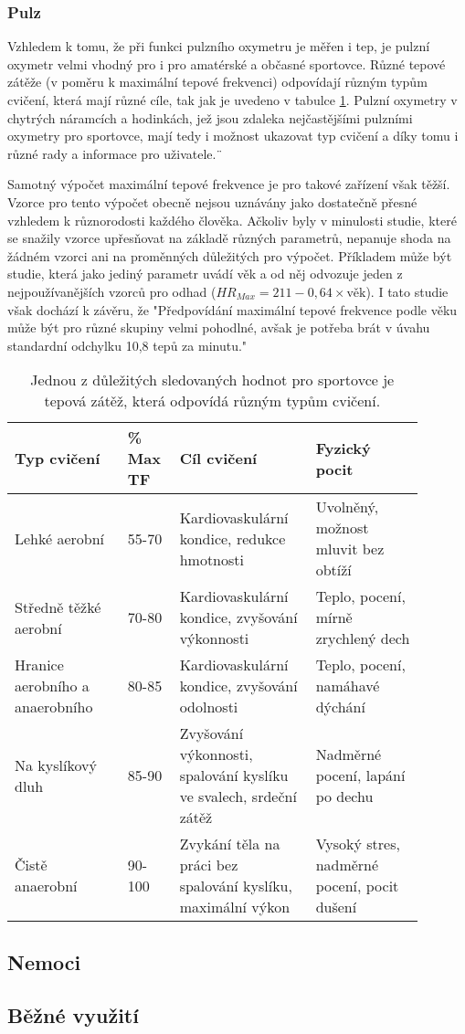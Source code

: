 \subsubsection {Pulz}
Vzhledem k tomu, že při funkci pulzního oxymetru je měřen i tep, je pulzní oxymetr velmi vhodný pro i pro amatérské a občasné sportovce. Různé tepové zátěže (v poměru k maximální tepové frekvenci) odpovídají různým typům cvičení, která mají různé cíle, tak jak je uvedeno v tabulce \ref{tab:MTF}. Pulzní oxymetry v chytrých náramcích a hodinkách, jež jsou zdaleka nejčastějšími pulzními oxymetry pro sportovce, mají tedy i možnost ukazovat typ cvičení a díky tomu i různé rady a informace pro uživatele.¨
\par Samotný výpočet maximální tepové frekvence je pro takové zařízení však těžší. Vzorce pro tento výpočet obecně nejsou uznávány jako dostatečně přesné vzhledem k různorodosti každého člověka. Ačkoliv byly v minulosti studie, které se snažily vzorce upřesňovat na základě různých parametrů, nepanuje shoda na žádném vzorci ani na proměnných důležitých pro výpočet. Příkladem může být studie, která jako jediný parametr uvádí věk a od něj odvozuje jeden z nejpoužívanějších vzorců pro odhad ($HR_{Max}=211-0,64\times\text{věk}$). I tato studie však dochází k závěru, že "Předpovídání maximální tepové frekvence podle věku může být pro různé skupiny velmi pohodlné, avšak je potřeba brát v úvahu standardní odchylku 10,8 tepů za minutu." \citep{maxHR}
\begin{table}[H]
    \centering
    \begin{tabular}{p{0.25\linewidth} | p{0.1\linewidth} | p{0.30\linewidth} | p{0.24\linewidth}}
        \textbf{Typ cvičení}            & \textbf{\% Max TF} & \textbf{Cíl cvičení}                                              & \textbf{Fyzický pocit}              \\ \hline
        Lehké aerobní                   & 55-70                    & Kardiovaskulární kondice, redukce hmotnosti                       & Uvolněný, možnost mluvit bez obtíží \\
        Středně těžké aerobní           & 70-80                    & Kardiovaskulární kondice, zvyšování výkonnosti                    & Teplo, pocení, mírně zrychlený dech \\
        Hranice aerobního a anaerobního & 80-85                    & Kardiovaskulární kondice, zvyšování odolnosti                     & Teplo, pocení, namáhavé dýchání     \\
        Na kyslíkový dluh               & 85-90                    & Zvyšování výkonnosti, spalování kyslíku ve svalech, srdeční zátěž & Nadměrné pocení, lapání po dechu    \\
        Čistě anaerobní                 & 90-100                   & Zvykání těla na práci bez spalování kyslíku, maximální výkon      & Vysoký stres, nadměrné pocení, pocit dušení
    \end{tabular}
    \caption[Typy cvičení podle maximální tepové frekvence]{Jednou z důležitých sledovaných hodnot pro sportovce je tepová zátěž, která odpovídá různým typům cvičení. \citep{tep}}%
    \label{tab:MTF}
\end{table}

\subsection {Nemoci}
\subsection {Běžné využití}